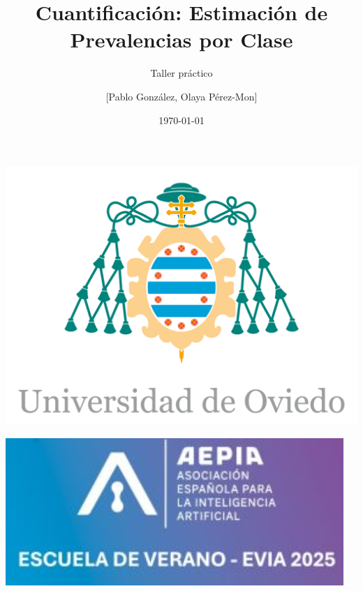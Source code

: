 \documentclass{beamer}
\title{Cuantificación: Estimación de Prevalencias por Clase}
\subtitle{Taller práctico}
\author{[Pablo González, Olaya Pérez-Mon]}
\institute{[Universidad de Oviedo]}
\date{\today}
\begin{document}
\begin{frame}
    \titlepage
    \vfill
    \centering
    \begin{minipage}[c]{0.3\textwidth}
        \includegraphics[width=\linewidth]{images/logo.png}
    \end{minipage}
    \hspace{1cm}
    \begin{minipage}[c]{0.3\textwidth}
        \includegraphics[width=\linewidth]{images/aepia.png}
    \end{minipage}
\end{frame}
\end{document}
